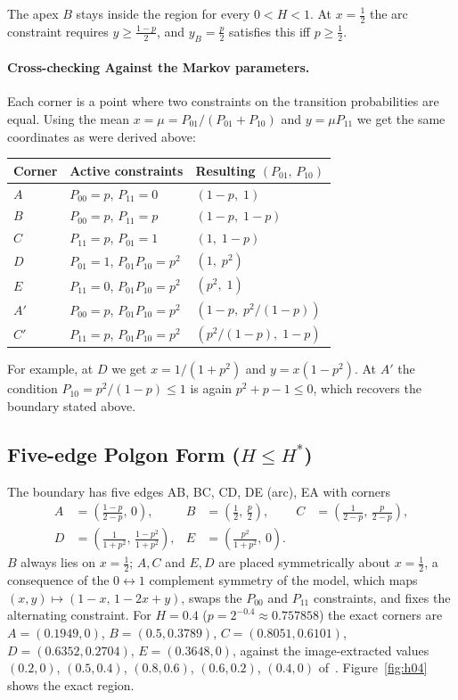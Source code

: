 \documentclass[11pt]{article}
\begin{document}
The apex $B$ stays inside the region for every $0 < H<1$. At $x=\tfrac12$ the arc
constraint requires $y\ge\tfrac{1-p}{2}$, and $y_B=\tfrac p2$ satisfies this
iff $p\ge\tfrac12$.

\paragraph{Cross-checking Against the Markov parameters.} Each corner is a point where two
constraints on the transition probabilities are equal. Using the
 mean $x=\mu=P_{01}/(P_{01}+P_{10})$ and $y=\mu P_{11}$ we get the
same coordinates as were derived above:
\begin{center}
\begin{tabular}{lll}
\toprule
Corner & Active constraints & Resulting $(P_{01},\,P_{10})$ \\
\midrule
$A$  & $P_{00}=p$, $P_{11}=0$ & $(1-p,\;1)$ \\
$B$  & $P_{00}=p$, $P_{11}=p$ & $(1-p,\;1-p)$ \\
$C$  & $P_{11}=p$, $P_{01}=1$ & $(1,\;1-p)$ \\
$D$  & $P_{01}=1$, $P_{01}P_{10}=p^2$ & $(1,\;p^2)$ \\
$E$  & $P_{11}=0$, $P_{01}P_{10}=p^2$ & $(p^2,\;1)$ \\
$A'$ & $P_{00}=p$, $P_{01}P_{10}=p^2$ & $(1-p,\;p^2/(1-p))$ \\
$C'$ & $P_{11}=p$, $P_{01}P_{10}=p^2$ & $(p^2/(1-p),\;1-p)$ \\
\bottomrule
\end{tabular}
\end{center}
For example, at $D$ we get $x=1/(1+p^2)$ and $y=x(1-p^2)$. At $A'$ the
condition $P_{10}=p^2/(1-p)\le1$ is again $p^2+p-1\le0$, which recovers the
 boundary stated above.

\subsection{Five-edge Polgon Form (\texorpdfstring{$H\le H^\ast$}{H<=H*})}
The boundary has five edges AB, BC, CD, DE (arc), EA with corners
\begin{equation}
\begin{aligned}
A &= \left(\tfrac{1-p}{2-p},\,0\right), &
B &= \left(\tfrac12,\,\tfrac{p}{2}\right), &
C &= \left(\tfrac{1}{2-p},\,\tfrac{p}{2-p}\right),\\[2pt]
D &= \left(\tfrac{1}{1+p^2},\,\tfrac{1-p^2}{1+p^2}\right), &
E &= \left(\tfrac{p^2}{1+p^2},\,0\right). &&
\end{aligned}
\label{eq:corners5}
\end{equation}
$B$ always lies on $x=\tfrac12$; $A,C$ and $E,D$ are placed symmetrically
about $x=\tfrac12$, a consequence of the $0\leftrightarrow1$ complement
symmetry of the model, which maps $(x,y)\mapsto(1-x,\,1-2x+y)$, swaps the
$P_{00}$ and $P_{11}$ constraints, and fixes the alternating constraint.
For $H=0.4$ ($p=2^{-0.4}\approx0.757858$) the exact corners are
$A=(0.1949,0)$, $B=(0.5,0.3789)$, $C=(0.8051,0.6101)$, $D=(0.6352,0.2704)$,
$E=(0.3648,0)$, against the image-extracted values
$(0.2,0)$, $(0.5,0.4)$, $(0.8,0.6)$, $(0.6,0.2)$, $(0.4,0)$
of~\cite{johnston2024}. Figure~\ref{fig:h04} shows the exact region.
\end{document}
